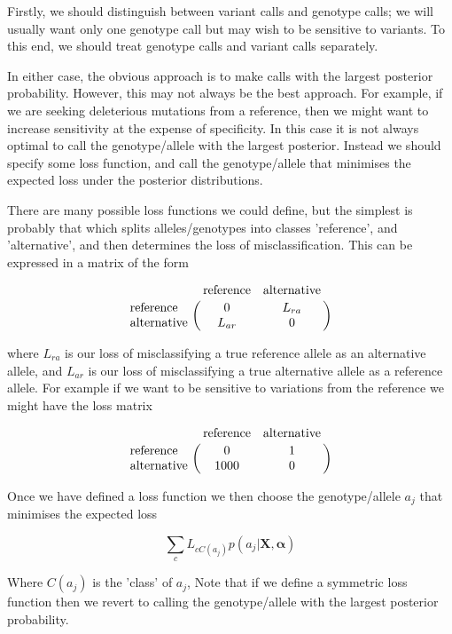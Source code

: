 \documentclass{article}
\begin{document}
Firstly, we should distinguish between variant calls and genotype calls; we will usually want only one genotype call but may wish to be sensitive to variants. To this end, we should treat genotype calls and variant calls separately.

In either case, the obvious approach is to make calls with the largest posterior probability. However, this may not always be the best approach. For example, if we are seeking deleterious mutations from a reference, then we might want to increase sensitivity at the expense of specificity. In this case it is not always optimal to call the genotype/allele with the largest posterior. Instead we should specify some loss function, and call the genotype/allele that minimises the expected loss under the posterior distributions.

There are many possible loss functions we could define, but the simplest is probably that which splits alleles/genotypes into classes 'reference', and 'alternative', and then determines the loss of misclassification. This can be expressed in a matrix of the form

\begin{equation}
\bordermatrix{~ & \text{reference} & \text{alternative} \cr
              \text{reference} & 0 & L_{ra} \cr
              \text{alternative} & L_{ar} & 0 \cr}
\end{equation}

where $L_{ra}$ is our loss of misclassifying a true reference allele as an alternative allele, and $L_{ar}$ is our loss of misclassifying a true alternative allele as a reference allele. For example if we want to be sensitive to variations from the reference we might have the loss matrix

\begin{equation}
\bordermatrix{~ & \text{reference} & \text{alternative} \cr
              \text{reference} & 0 & 1 \cr
              \text{alternative} & 1000 & 0 \cr}
\end{equation}

Once we have defined a loss function we then choose the genotype/allele $a_j$ that minimises the expected loss

\begin{equation}
\sum_{c} L_{cC(a_j)}p(a_j | \boldsymbol{X}, \boldsymbol{\alpha})
\end{equation}

Where $C(a_j)$ is the 'class' of $a_j$, Note that if we define a symmetric loss function then we revert to calling the genotype/allele with the largest posterior probability.
\end{document}
